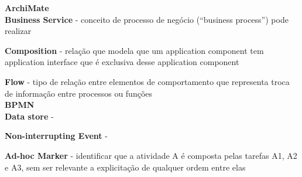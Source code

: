 \documentclass[twocolumn, 10pt]{article}
\begin{document}
\textbf{ArchiMate} \\[2pt]
\textbf{Business Service} - conceito de processo de negócio (“business process”) pode realizar

\textbf{Composition} - relação que modela que um application component tem application interface que é exclusiva desse application component

\textbf{Flow} - tipo de relação entre elementos de comportamento que representa troca de informação entre processos ou funções
\\[6pt]
\textbf{BPMN} \\[2pt]
\textbf{Data store} - 

\textbf{Non-interrupting Event} - 

\textbf{Ad-hoc Marker} - identificar que a atividade A é composta pelas tarefas A1, A2 e A3, sem ser relevante a explicitação de qualquer ordem entre elas
\end{document}
